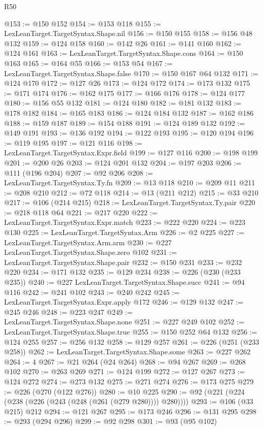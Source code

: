 \begin{lexlean}{R50}
\begin{coremodule}
{{{{{{{{{{{{{{{{{{{{{{{{{{{{{{{{{{{{{{{{{{{{{{{{{{{{{{{{{{{{@153 := @150 @152
@154 := @153 @118
@155 := LexLeanTarget.TargetSyntax.Shape.nil
@156 := @150 @155
@158 := @156 @48 @132
@159 := @124 @158
@160 := @142 @26
@161 := @141 @160
@162 := @124 @161
@163 := LexLeanTarget.TargetSyntax.Shape.cons
@164 := @150 @163
@165 := @164 @55
@166 := @153 @54
@167 := LexLeanTarget.TargetSyntax.Shape.false
@170 := @150 @167 @64 @132
@171 := @124 @170
@172 := @127 @26
@173 := @124 @172
@174 := @173 @132
@175 := @171 @174
@176 := @162 @175
@177 := @166 @176
@178 := @124 @177
@180 := @156 @55 @132
@181 := @124 @180
@182 := @181 @132
@183 := @178 @182
@184 := @165 @183
@186 := @124 @184 @132
@187 := @162 @186
@188 := @159 @187
@189 := @154 @188
@191 := @124 @189 @132
@192 := @149 @191
@193 := @136 @192
@194 := @122 @193
@195 := @120 @194
@196 := @119 @195
@197 := @121 @116
@198 := LexLeanTarget.TargetSyntax.Expr.field
@199 := @127 @116
@200 := @198 @199
@201 := @200 @26
@203 := @124 @201 @132
@204 := @197 @203
@206 := @111 (@196 @204)
@207 := @92 @206
@208 := LexLeanTarget.TargetSyntax.Ty.fn
@209 := @13 @118
@210 := @209 @11
@211 := @208 @210
@212 := @72 @118
@214 := @13 (@211 @212)
@215 := @33 @210
@217 := @106 (@214 @215)
@218 := LexLeanTarget.TargetSyntax.Ty.pair
@220 := @218 @118 @64
@221 := @217 @220
@222 := LexLeanTarget.TargetSyntax.Expr.match
@223 := @222 @220
@224 := @223 @130
@225 := LexLeanTarget.TargetSyntax.Arm
@226 := @2 @225
@227 := LexLeanTarget.TargetSyntax.Arm.arm
@230 := @227 LexLeanTarget.TargetSyntax.Shape.zero @102
@231 := LexLeanTarget.TargetSyntax.Shape.pair
@232 := @150 @231
@233 := @232 @220
@234 := @171 @132
@235 := @129 @234
@238 := @226 (@230 (@233 @235))
@240 := @227 LexLeanTarget.TargetSyntax.Shape.succ
@241 := @94 @116
@242 := @241 @102
@243 := @240 @242
@245 := LexLeanTarget.TargetSyntax.Expr.apply @172
@246 := @129 @132
@247 := @245 @246
@248 := @223 @247
@249 := LexLeanTarget.TargetSyntax.Shape.none
@251 := @227 @249 @102
@252 := LexLeanTarget.TargetSyntax.Shape.true
@255 := @150 @252 @64 @132
@256 := @124 @255
@257 := @256 @132
@258 := @129 @257
@261 := @226 (@251 (@233 @258))
@262 := LexLeanTarget.TargetSyntax.Shape.some
@263 := @227 @262
@264 := 4
@267 := @21 @264 (@24 @264)
@268 := @94 @267
@269 := @268 @102
@270 := @263 @269
@271 := @124 @199
@272 := @127 @267
@273 := @124 @272
@274 := @273 @132
@275 := @271 @274
@276 := @173 @275
@279 := @226 (@270 (@122 @276))
@280 := @10 @225
@290 := @92 (@221 (@224 (@238 (@226 (@243 (@248 (@261 (@279 @280)))) @280))))
@293 := @106 (@33 @215) @212
@294 := @121 @267
@295 := @173 @246
@296 := @131 @295
@298 := @293 (@294 @296)
@299 := @92 @298
@301 := @93 (@95 @102)
}}}}}}}}}}}}}}}}}}}}}}}}}}}}}}}}}}}}}}}}}}}}}}}}}}}}}}}}}}}}
\end{coremodule}
\end{lexlean}
